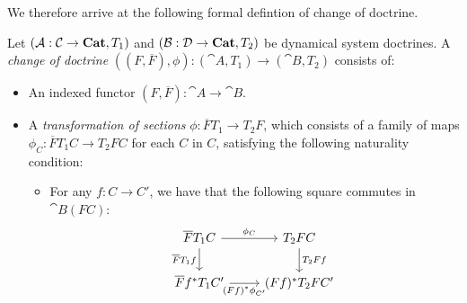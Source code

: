\documentclass[DynamicalBook]{subfiles}
\begin{document}
We therefore arrive at the following formal defintion of change of doctrine.
\begin{definition}\label{def.change_of_doctrine}
  Let $(\mathcal{A} : \mathcal{C} \to \textbf{Cat}, T_1)$ and $(\mathcal{B} : \mathcal{D} \to
  \textbf{Cat}, T_2)$ be dynamical system doctrines. A \emph{change of doctrine}
  $((F, \overline{F}), \phi) : (\cat{A}, T_1) \to (\cat{B}, T_2)$ consists of:
\begin{itemize}
  \item An indexed functor $(F, \overline{F}) : \cat{A} \to \cat{B}$. 
  \item A \emph{transformation of sections} $\phi : \overline{F}T_1 \to T_2 F$,
    which consists of a family of maps $\phi_C : \overline{F}T_1 C \to T_2 FC$
    for each $C$ in $C$, satisfying the following naturality condition:
    \begin{itemize}
      \item For any $f : C \to C'$, we have that the following square commutes
        in $\cat{B}(FC)$:
        \begin{equation}\label{eqn.transformation_of_sections}
\begin{tikzcd}
\overline{F}T_1 C  \ar[d, "\overline{F}T_1f"'] \ar[r, "\phi_C"]& T_2 F C \ar[d, "T_2Ff"] \\
\overline{F}f^{\ast}T_1 C' \ar[r,"(Ff)^{\ast}\phi_{C'}"']& (Ff)^{\ast}T_2 FC'
\end{tikzcd}
\end{equation}
\end{itemize}

\end{itemize} 
\end{definition}
\end{document}
